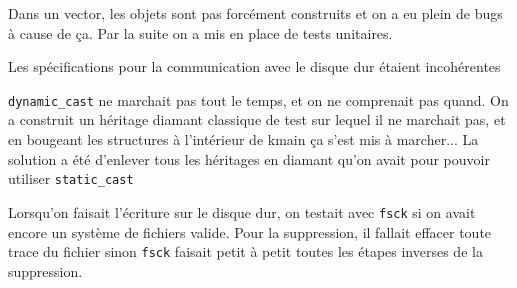 \documentclass[12pt]{report}
\begin{document}
Dans un vector, les objets sont pas forcément construits et on a eu plein de bugs à cause de ça.
Par la suite on a mis en place de tests unitaires.

Les spécifications pour la communication avec le disque dur étaient incohérentes

\verb$dynamic_cast$ ne marchait pas tout le temps, et on ne comprenait pas quand. On a construit un héritage diamant classique de test sur lequel il ne marchait pas, et en bougeant les structures à l'intérieur de kmain ça s'est mis à marcher...
La solution a été d'enlever tous les héritages en diamant qu'on avait pour pouvoir utiliser \verb$static_cast$

Lorsqu'on faisait l'écriture sur le disque dur, on testait avec \verb$fsck$ si on avait encore un système de fichiers valide. Pour la suppression, il fallait effacer toute trace du fichier sinon \verb$fsck$ faisait petit à petit toutes les étapes inverses de la suppression.





\end{document}
